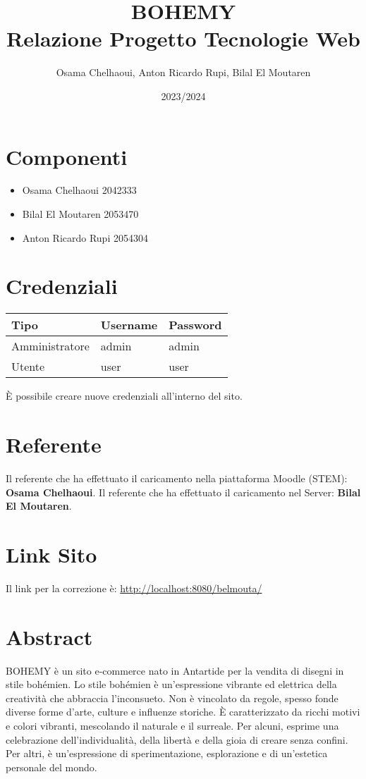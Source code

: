 \documentclass[11pt]{article}
\author{Osama Chelhaoui, Anton Ricardo Rupi, Bilal El Moutaren}
\date{2023/2024}
\title{BOHEMY\\\medskip
\large Relazione Progetto Tecnologie Web}
\begin{document}
\maketitle
\newpage
\tableofcontents

\setcounter{tocdepth}{100}

\section{Componenti}
\label{sec:org7185dae}
\begin{itemize}
\item Osama Chelhaoui 2042333
\item Bilal El Moutaren 2053470
\item Anton Ricardo Rupi 2054304
\end{itemize}
\section{Credenziali}
\label{sec:orgf3338f6}

\begin{center}
\begin{tabular}{lll}
Tipo & Username & Password\\[0pt]
\hline
Amministratore & admin & admin\\[0pt]
Utente & user & user\\[0pt]
\end{tabular}
\end{center}

È possibile creare nuove credenziali all'interno del sito.
\section{Referente}
\label{sec:org0c27bea}

Il referente che ha effettuato il caricamento nella piattaforma Moodle (STEM): \textbf{Osama Chelhaoui}.
\newline
Il referente che ha effettuato il caricamento nel Server: \textbf{Bilal El Moutaren}.
\section{Link Sito}
\label{sec:org14e5481}

Il link per la correzione è: \url{http://localhost:8080/belmouta/}
\newpage
\section{Abstract}
\label{sec:org887a840}
BOHEMY è un sito e-commerce nato in Antartide per la vendita di disegni in stile bohémien. Lo stile bohémien è un'espressione vibrante ed elettrica della creatività che abbraccia l'inconsueto. Non è vincolato da regole, spesso fonde diverse forme d'arte, culture e influenze storiche. È caratterizzato da ricchi motivi e colori vibranti, mescolando il naturale e il surreale. Per alcuni, esprime una celebrazione dell'individualità, della libertà e della gioia di creare senza confini. Per altri, è un'espressione di sperimentazione, esplorazione e di un'estetica personale del mondo.
\end{document}
